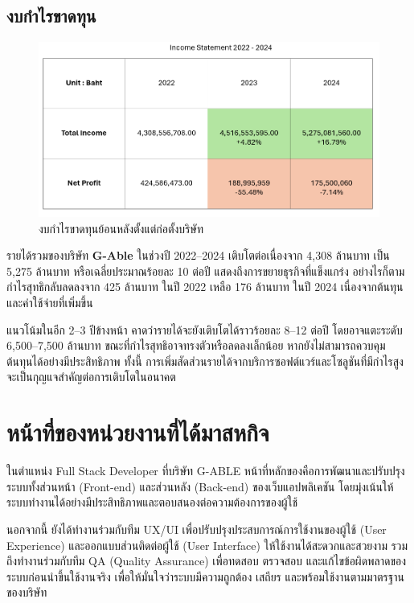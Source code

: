\subsection{งบกำไรขาดทุน}
\begin{figure}[ht]
    \begin{center}
        \includegraphics[scale=0.4]{images/income.png}
    \end{center}
    \caption[งบกำไรขาดทุนย้อนหลังตั้งแต่ก่อตั้งบริษัท]{งบกำไรขาดทุนย้อนหลังตั้งแต่ก่อตั้งบริษัท}
\end{figure}

รายได้รวมของบริษัท \textbf{G-Able} ในช่วงปี 2022–2024 เติบโตต่อเนื่องจาก 4,308 ล้านบาท เป็น 5,275 ล้านบาท หรือเฉลี่ยประมาณร้อยละ 10 ต่อปี แสดงถึงการขยายธุรกิจที่แข็งแกร่ง อย่างไรก็ตาม กำไรสุทธิกลับลดลงจาก 425 ล้านบาท ในปี 2022 เหลือ 176 ล้านบาท ในปี 2024 เนื่องจากต้นทุนและค่าใช้จ่ายที่เพิ่มขึ้น

\noindent แนวโน้มในอีก 2–3 ปีข้างหน้า คาดว่ารายได้จะยังเติบโตได้ราวร้อยละ 8–12 ต่อปี โดยอาจแตะระดับ 6,500–7,500 ล้านบาท ขณะที่กำไรสุทธิอาจทรงตัวหรือลดลงเล็กน้อย หากยังไม่สามารถควบคุมต้นทุนได้อย่างมีประสิทธิภาพ ทั้งนี้ การเพิ่มสัดส่วนรายได้จากบริการซอฟต์แวร์และโซลูชันที่มีกำไรสูง จะเป็นกุญแจสำคัญต่อการเติบโตในอนาคต

\clearpage


\section{หน้าที่ของหน่วยงานที่ได้มาสหกิจ}
ในตำแหน่ง Full Stack Developer ที่บริษัท G-ABLE หน้าที่หลักของคือการพัฒนาและปรับปรุงระบบทั้งส่วนหน้า (Front-end) และส่วนหลัง (Back-end) ของเว็บแอปพลิเคชัน โดยมุ่งเน้นให้ระบบทำงานได้อย่างมีประสิทธิภาพและตอบสนองต่อความต้องการของผู้ใช้

นอกจากนี้ ยังได้ทำงานร่วมกับทีม UX/UI เพื่อปรับปรุงประสบการณ์การใช้งานของผู้ใช้ (User Experience) และออกแบบส่วนติดต่อผู้ใช้ (User Interface) ให้ใช้งานได้สะดวกและสวยงาม รวมถึงทำงานร่วมกับทีม QA (Quality Assurance) เพื่อทดสอบ ตรวจสอบ และแก้ไขข้อผิดพลาดของระบบก่อนนำขึ้นใช้งานจริง เพื่อให้มั่นใจว่าระบบมีความถูกต้อง เสถียร และพร้อมใช้งานตามมาตรฐานของบริษัท
